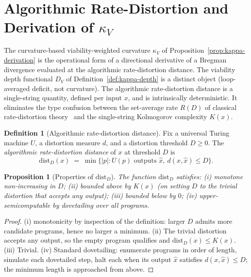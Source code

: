\documentclass[11pt,a4paper]{article}
\theoremstyle{plain}
\newtheorem{proposition}[theorem]{Proposition}
\theoremstyle{definition}
\newtheorem{definition}[theorem]{Definition}
\theoremstyle{remark}
\newcommand{\kk}{\kappa_{\!V}}
\newcommand{\distD}{\mathrm{dist}_{D}}
\begin{document}
\section{Algorithmic Rate-Distortion and Derivation of \texorpdfstring{$\kk$}{kappa_V}}\label{sec:ard}

The curvature-based viability-weighted curvature $\kk$ of
Proposition~\ref{prop:kappa-derivation} is
the operational form of a directional derivative of a Bregman divergence
evaluated at the algorithmic rate-distortion distance. The viability
depth functional $D_V$ of Definition~\ref{def:kappa-depth} is a distinct
object (loop-averaged deficit, not curvature). The
algorithmic rate-distortion distance is a single-string quantity,
defined per input $x$, and is intrinsically deterministic. It eliminates
the type confusion between the set-average rate $R(D)$ of classical
rate-distortion theory~\cite{coverthomas1991} and the single-string
Kolmogorov complexity $K(x)$.

\begin{definition}[Algorithmic rate-distortion distance]
\label{def:ard}
Fix a universal Turing machine $U$, a distortion measure $d$, and a
distortion threshold $D\geq 0$. The \emph{algorithmic rate-distortion
distance} of $x$ at threshold $D$ is
\begin{equation}\label{eq:distD}
  \distD(x) \;=\; \min\bigl\{|p| : U(p)\text{ outputs }\hat x,\ d(x,\hat x)\leq D\bigr\}.
\end{equation}
\end{definition}

\begin{proposition}[Properties of $\distD$]\label{prop:ard-props}
The function $\distD$ satisfies: (i) monotone non-increasing in $D$;
(ii) bounded above by $K(x)$ (on setting $D$ to the trivial distortion
that accepts any output); (iii) bounded below by $0$; (iv) upper-
semicomputable by dovetailing over all programs.
\end{proposition}

\begin{proof}
(i) monotonicity by inspection of the definition: larger $D$ admits
more candidate programs, hence no larger a minimum. (ii) The trivial
distortion accepts any output, so the empty program qualifies and
$\distD(x)\leq K(x)$. (iii) Trivial. (iv) Standard dovetailing: enumerate
programs in order of length, simulate each dovetailed step, halt each
when its output $\hat x$ satisfies $d(x,\hat x)\leq D$; the minimum
length is approached from above.
\end{proof}
\end{document}
